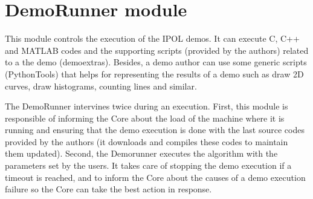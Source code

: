 
\section{DemoRunner module}
\label{sec:DemoRunner}

This module controls the execution of the IPOL demos. It can execute C, C++ and MATLAB codes and the supporting scripts (provided by the authors) related to a the demo (demoextras). Besides, a demo author can use some generic scripts (PythonTools) that helps for representing the results of a demo such as draw 2D curves, draw histograms, counting lines and similar.

The DemoRunner intervines twice during an execution. First, this module is responsible of informing the Core about the load of the machine where it is running and ensuring that the demo execution is done with the last source codes provided by the authors (it downloads and compiles these codes to maintain them updated). Second, the Demorunner executes the algorithm with the parameters set by the users. It takes care of stopping the demo execution if a timeout is reached, and to inform the Core about the causes of a demo execution failure so the Core can take the best action in response. 